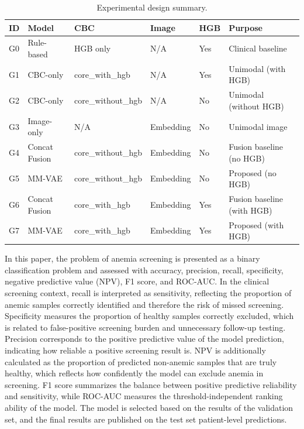 \documentclass[conference]{IEEEtran}
\begin{document}
\begin{table}[t]
\caption{Experimental design summary.}
\label{tab:experiment-design}
\centering
\small
\begin{tabular}{p{}p{}p{}p{}p{}p{}}
\hline
\textbf{ID} & \textbf{Model} & \textbf{CBC} & \textbf{Image} & \textbf{HGB} & \textbf{Purpose} \\
\hline
G0 & Rule-based & HGB only & N/A & Yes & Clinical baseline \\
G1 & CBC-only & core\_with\_hgb & N/A & Yes & Unimodal (with HGB) \\
G2 & CBC-only & core\_without\_hgb & N/A & No & Unimodal (without HGB) \\
G3 & Image-only & N/A & Embedding & No & Unimodal image \\
G4 & Concat Fusion & core\_without\_hgb & Embedding & No & Fusion baseline (no HGB) \\
G5 & MM-VAE & core\_without\_hgb & Embedding & No & Proposed (no HGB) \\
G6 & Concat Fusion & core\_with\_hgb & Embedding & Yes & Fusion baseline (with HGB) \\
G7 & MM-VAE & core\_with\_hgb & Embedding & Yes & Proposed (with HGB) \\
\hline
\end{tabular}
\end{table}

In this paper, the problem of anemia screening is presented as a binary classification problem and assessed with accuracy, precision, recall, specificity, negative predictive value (NPV), F1 score, and ROC-AUC. In the clinical screening context, recall is interpreted as sensitivity, reflecting the proportion of anemic samples correctly identified and therefore the risk of missed screening. Specificity measures the proportion of healthy samples correctly excluded, which is related to false-positive screening burden and unnecessary follow-up testing. Precision corresponds to the positive predictive value of the model prediction, indicating how reliable a positive screening result is. NPV is additionally calculated as the proportion of predicted non-anemic samples that are truly healthy, which reflects how confidently the model can exclude anemia in screening. F1 score summarizes the balance between positive predictive reliability and sensitivity, while ROC-AUC measures the threshold-independent ranking ability of the model. The model is selected based on the results of the validation set, and the final results are published on the test set patient-level predictions.
\end{document}
